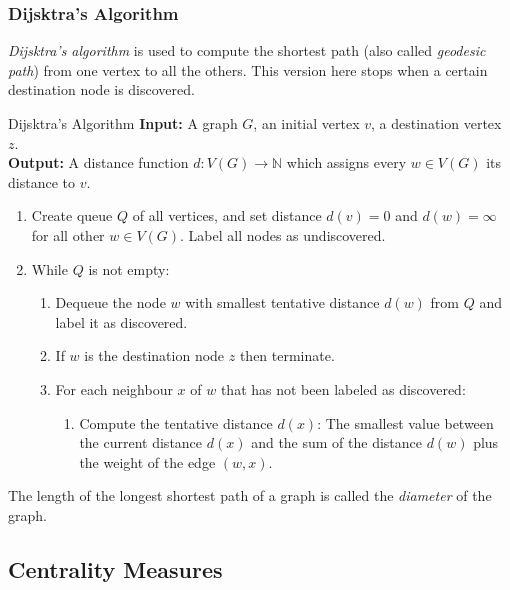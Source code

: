 \documentclass[english]{panikzettel}
\newcommand{\N}{\mathbb{N}}
\begin{document}
\subsubsection*{Dijsktra's Algorithm}

\textit{Dijsktra's algorithm} is used to compute the shortest path (also called \emph{geodesic path}) from one vertex to all the others.
This version here stops when a certain destination node is discovered.

\begin{algo}{Dijsktra's Algorithm}
    \textbf{Input:} A graph $G$, an initial vertex $v$, a destination vertex $z$.\\
    \textbf{Output:} A distance function $d:V(G) \to \N$ which assigns every $w \in V(G)$ its distance to $v$.
    \tcblower
    \begin{enumerate}
        \item Create queue $Q$ of all vertices, and set distance $d(v) = 0$ and $d(w) = \infty$ for all other $w \in V(G)$. Label all nodes as undiscovered.
        \item While $Q$ is not empty:
            \begin{enumerate}
                \item Dequeue the node $w$ with smallest tentative distance $d(w)$ from $Q$ and label it as discovered.
                \item If $w$ is the destination node $z$ then terminate.
                \item For each neighbour $x$ of $w$ that has not been labeled as discovered:
                    \begin{enumerate}
                        \item Compute the tentative distance $d(x)$: The smallest value between the current distance $d(x)$ and the sum of the distance $d(w)$ plus the weight of the edge $(w,x)$.
                    \end{enumerate}
            \end{enumerate}
    \end{enumerate}
\end{algo}

The length of the longest shortest path of a graph is called the \emph{diameter} of the graph.

\subsection{Centrality Measures}
\end{document}
